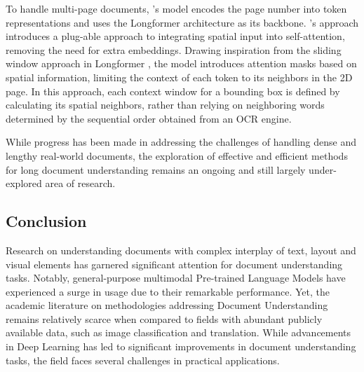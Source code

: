 To handle multi-page documents, \citet{pramanik2020towards}'s model encodes the page number into token representations and uses the Longformer architecture as its backbone. \citet{pham2022understanding}'s approach introduces a plug-able approach to integrating spatial input into self-attention, removing the need for extra embeddings. Drawing inspiration from the sliding window approach in Longformer \citep{beltagy2020longformer}, the model introduces attention masks based on spatial information, limiting the context of each token to its neighbors in the 2D page. In this approach, each context window for a bounding box is defined by calculating its spatial neighbors, rather than relying on neighboring words determined by the sequential order obtained from an \ac{OCR} engine.

While progress has been made in addressing the challenges of handling dense and lengthy real-world documents, the exploration of effective and efficient methods for long document understanding remains an ongoing and still largely under-explored area of research. 


\subsection{Conclusion}

Research on understanding documents with complex interplay of text, layout and visual elements has garnered significant attention for document understanding tasks. Notably, general-purpose multimodal Pre-trained Language Models have experienced a surge in usage due to their remarkable performance. Yet, the academic literature on methodologies addressing Document Understanding remains relatively scarce when compared to fields with abundant publicly available data, such as image classification and translation. While advancements in Deep Learning has led to significant improvements in document understanding tasks, the field faces several challenges in practical applications. 

